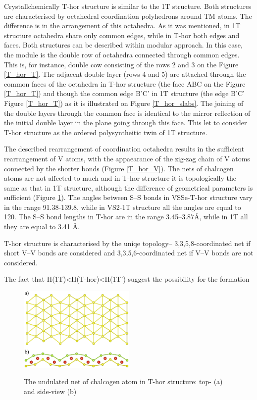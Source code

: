 \documentclass[a4paperm]{article}
\begin{document}
Crystallchemically T-hor structure is similar to the 1T structure.
Both structures are characterised by octahedral coordination polyhedrons around TM atoms.
The difference is in the arrangement of this octahedra.
As it was mentioned, in 1T structure octahedra share only common edges, while in T-hor both edges and faces.
Both structures can be described within modular approach.
In this case, the module is the double row of octahedra connected through common edges.
This is, for instance, double cow consisting of the rows 2 and 3 on the Figure \ref{T_hor_T}.
The adjacent double layer (rows 4 and 5) are attached through the common faces  of the octahedra in T-hor structure (the face ABC on the Figure \ref{T_hor_T}) and though the common edge B'C' in 1T structure (the edge B'C' Figure \ref{T_hor_T}) as it is illustrated on Figure \ref{T_hor_slabs}.
The joining of the double layers through the common face is identical to the mirror reflection of the initial double layer in the plane going through this face.
This let to consider T-hor structure as the ordered polysyntheitic twin of 1T structure.

The described rearrangement of coordination octahedra results in the sufficient rearrangement of V atoms, with the appaearance of the zig-zag chain of V atoms connected by the shorter bonds (Figure \ref{T_hor_V}).
The nets of chalcogen atoms are not affected to much and in T-hor structure it is topologically the same as that in 1T structure, although the difference of geometrical parameters is sufficient (Figure \ref{T_hor_hcb}).
The angles between S--S bonds in VSSe-T-hor structure vary in the range 91.38-139.8\textdegree, while in VS2-1T structure all the angles are equal to 120\textdegree.
The S--S bond lengths in T-hor are in the range 3.45--3.87\AA, while in 1T all they are equal to 3.41 \AA.

T-hor structure is characterised by the uniqe topology– 3,3,5,8-coordinated net if short V--V bonds are considered and 3,3,5,6-coordinated net if V--V bonds are not considered.

The fact that H(1T)<H(T-hor)<H(1T') suggest the possibility for the formation

\begin{figure}[H]
        \includegraphics[width=0.5\textwidth]{T_hor_hcb.png} \\
        \caption{The undulated net of chalcogen atom in T-hor structure: top- (a) and side-view (b)}
\label{T_hor_hcb}
\end{figure}
\end{document}
